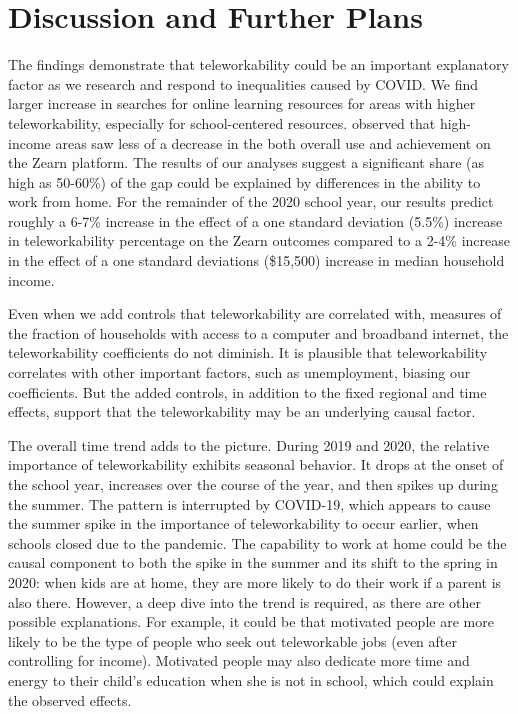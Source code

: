 \section{Discussion and Further Plans} \label{sec:discussion}

The findings demonstrate that teleworkability could be an important explanatory factor as we research and respond to inequalities caused by COVID.  We find larger increase in searches for online learning resources for areas with higher teleworkability, especially for school-centered resources. \cite{chetty} observed that high-income areas saw less of a decrease in the both overall use and achievement on the Zearn platform. The results of our analyses suggest a significant share (as high as 50-60\%) of the gap could be explained by differences in the ability to work from home. For the remainder of the 2020 school year, our results predict roughly a 6-7\% increase in the effect of a one standard deviation (5.5\%) increase in teleworkability percentage on the Zearn outcomes compared to a 2-4\% increase in the effect of a one standard deviations (\$15,500) increase in median household income. \par
	Even when we add controls that teleworkability are correlated with, measures of the fraction of households with access to a computer and broadband internet, the teleworkability coefficients do not diminish. It is plausible that teleworkability correlates with other important factors, such as unemployment, biasing our coefficients. But the added controls, in addition to the fixed regional and time effects, support that the teleworkability may be an underlying causal factor. \par
The overall time trend adds to the picture. During 2019 and 2020, the relative importance of teleworkability exhibits seasonal behavior. It drops at the onset of the school year, increases over the course of the year, and then spikes up during the summer. The pattern is interrupted by COVID-19, which appears to cause the summer spike in the importance of teleworkability to occur earlier, when schools closed due to the pandemic. The capability to work at home could be the causal component to both the spike in the summer and its shift to the spring in 2020: when kids are at home, they are more likely to do their work if a parent is also there. However, a deep dive into the trend is required, as there are other possible explanations. For example, it could be that motivated people are more likely to be the type of people who seek out teleworkable jobs (even after controlling for income). Motivated people may also dedicate more time and energy to their child’s education when she is not in school, which could explain the observed effects. \par
